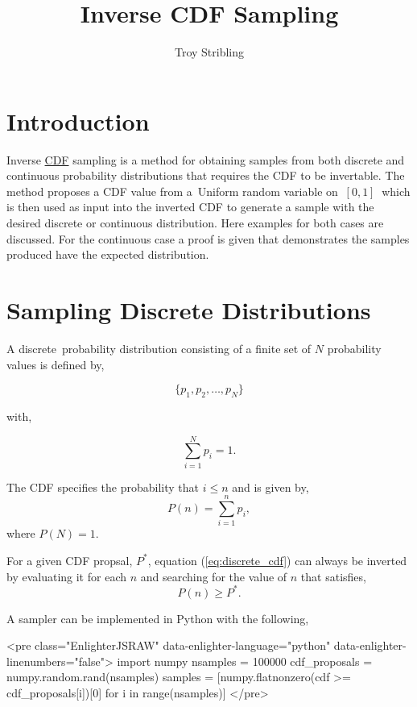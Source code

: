 \documentclass[12pt]{article}
\title{Inverse CDF Sampling}
\author{Troy Stribling}
\begin{document}
\iftex
\maketitle
\fi

\section{Introduction}

Inverse \href{https://en.wikipedia.org/wiki/Cumulative_distribution_function}{CDF} sampling is a method for obtaining samples from both discrete and continuous probability distributions
that requires the CDF to be invertable.
The method proposes a CDF value from a Uniform random variable on $\ [0, 1]\ $ which is then used as input
into the inverted CDF to generate a sample
with the desired discrete or continuous distribution. Here examples for both cases are discussed.
For the continuous case a proof is given that demonstrates the samples produced have the expected distribution.

\section{Sampling Discrete Distributions}

A discrete probability distribution consisting of a finite set of $N$ probability values is defined by,

\begin{equation}
\label{eq:discrete_distribution}
\{ p_1, p_2,\ldots,p_N\}
\end{equation}

with,

$$\sum_{i=1}^N{p_i} = 1.$$

The CDF specifies the probability that $i \leq n$ and is given by,
\begin{equation}
\label{eq:discrete_cdf}
P(n)=\sum_{i=1}^n{p_i},
\end{equation}
where $P(N)=1.$

For a given CDF propsal, $P^*$, equation (\ref{eq:discrete_cdf}) can always be inverted by evaluating it for each $n$ and
searching for the value of $n$ that satisfies,
$$P(n) \geq P^*.$$

A sampler can be implemented in Python with the following,

\ifblog
<pre class="EnlighterJSRAW" data-enlighter-language="python" data-enlighter-linenumbers="false">
import numpy
nsamples = 100000
cdf_proposals = numpy.random.rand(nsamples)
samples = [numpy.flatnonzero(cdf >= cdf_proposals[i])[0] for i in range(nsamples)]
</pre>
\fi
\end{document}
